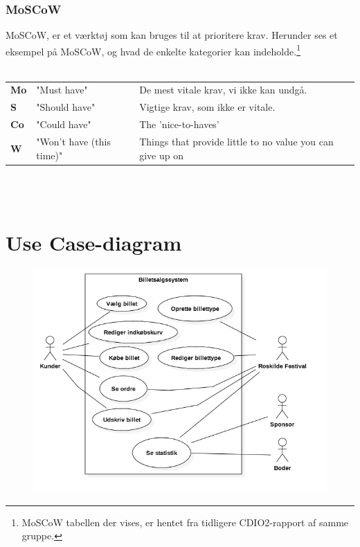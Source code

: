 \subsubsection{MoSCoW}

MoSCoW, er et værktøj som kan bruges til at prioritere krav.
Herunder ses et eksempel på MoSCoW, og hvad de enkelte kategorier kan indeholde.\footnote{MoSCoW tabellen der vises, er hentet fra tidligere CDIO2-rapport af samme gruppe.} \\\\

\begin{tabular}{lll}
    \textbf{Mo} &   
    "Must have"                 &
    De mest vitale krav, vi ikke kan undgå. \\

    \textbf{S}  &   
    "Should have"               & 
    Vigtige krav, som ikke er vitale. \\

    \textbf{Co} &   
    "Could have"                & 
    The 'nice-to-haves' \\

    \textbf{W}  &   
    "Won’t have (this time)"    & 
    Things that provide little to no value you can give up on \\

\end{tabular}
\\\\

\section{Use Case-diagram}
\begin{figure}[H]
    \begin{center}
        \includegraphics[width=1\textwidth]{UseCaseDiagram.png}
    \end{center}
\end{figure}

